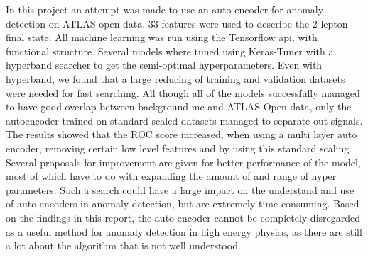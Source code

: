 \documentclass[ reprint, amsmath,amssymb, aps, nofootinbib]{revtex4-2}
\begin{document}
In this project an attempt was made to use an auto encoder for anomaly detection on ATLAS open data. 33 features were used to describe the 2 lepton final state. All machine learning was run using the Tensorflow api, with functional structure. Several models where tuned using Keras-Tuner with a hyperband searcher to get the semi-optimal hyperparameters. Even with hyperband, we found that a large reducing of training and validation datasets were needed for fast searching. All though all of the models successfully managed to have good overlap between background mc and ATLAS Open data, only the autoencoder trained on standard scaled datasets managed to separate out signals. The results showed that the ROC score increased, when using a multi layer auto encoder, removing certain low level features and by using this standard scaling. Several proposals for improvement are given for better performance of the model, most of which have to do with expanding the amount of and range of hyper parameters. Such a search could have a large impact on the understand and use of auto encoders in anomaly detection, but are extremely time consuming. Based on the findings in this report, the auto encoder cannot be completely disregarded as a useful method for anomaly detection in high energy physics, as there are still a lot about the algorithm that is not well understood. 



\mbox{~}
\onecolumngrid
\printbibliography

\newpage
\appendix
\end{document}
